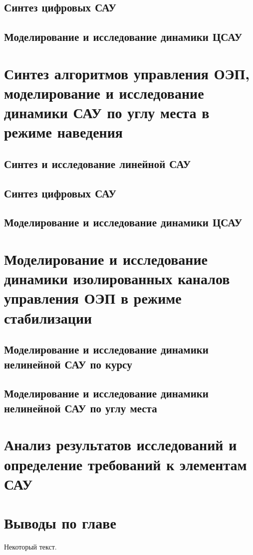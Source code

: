 \subsection{Синтез цифровых САУ } \label{subsec:ch4/sect4/sub3}


\subsection{Моделирование и исследование динамики ЦСАУ} \label{subsec:ch4/sect4/sub4}


\section{Синтез алгоритмов управления ОЭП, моделирование и исследование динамики САУ  по углу места  в режиме наведения} \label{ch:ch4/sect5}


\subsection{Синтез и исследование линейной САУ} \label{subsec:ch4/sect5/sub1}


\subsection{Синтез цифровых САУ } \label{subsec:ch4/sect5/sub2}


\subsection{Моделирование и исследование динамики ЦСАУ} \label{subsec:ch4/sect5/sub3}



\section{Моделирование и исследование динамики изолированных каналов управления ОЭП в режиме стабилизации} \label{ch:ch4/sect6}


\subsection{Моделирование и исследование динамики нелинейной САУ по курсу} \label{subsec:ch4/sect6/sub1}


\subsection{Моделирование и исследование динамики нелинейной САУ по углу места} \label{subsec:ch4/sect6/sub2}


\section{Анализ результатов исследований и определение требований к элементам САУ} \label{ch:ch4/sect7}


\section{Выводы по главе} \label{ch:ch4/sect8}



Некоторый текст.

\clearpage